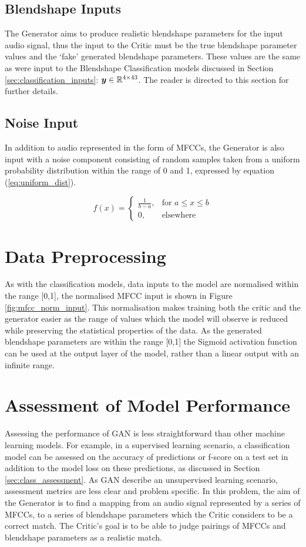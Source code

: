 \subsection{Blendshape Inputs}
The Generator aims to produce realistic blendshape parameters for the input audio signal, thus the input to the Critic must be the true blendshape parameter values and the `fake' generated blendshape parameters.
These values are the same as were input to the Blendshape Classification models discussed in Section \ref{sec:classification_inputs}: ${\boldsymbol{{y}}} \in \mathbb{R}^{4 \times 43}$.
The reader is directed to this section for further details.

\subsection{Noise Input}
In addition to audio represented in the form of MFCCs, the Generator is also input with a noise component consisting of random samples taken from a uniform probability distribution within the range of 0 and 1, expressed by equation (\ref{eq:uniform_dist}).

\begin{equation}\label{eq:uniform_dist}
    f(x)=\begin{cases}
      \frac{1}{b-a}, & \text{for $a \leq x \leq b$}\\
      0, & \text{elsewhere}
    \end{cases}
\end{equation}

\section{Data Preprocessing}
As with the classification models, data inputs to the model are normalised within the range [0,1], the normalised MFCC input is shown in Figure \ref{fig:mfcc_norm_input}.
This normalisation makes training both the critic and the generator easier as the range of values which the model will observe is reduced while preserving the statistical properties of the data.
As the generated blendshape parameters are within the range [0,1] the Sigmoid activation function can be used at the output layer of the model, rather than a linear output with an infinite range.

\section{Assessment of Model Performance}
Assessing the performance of GAN is less straightforward than other machine learning models.
For example, in a supervised learning scenario, a classification model can be assessed on the accuracy of predictions or f-score on a test set in addition to the model loss on these predictions, as discussed in Section \ref{sec:class_assessment}.
As GAN describe an unsupervised learning scenario, assessment metrics are less clear and problem specific.
In this problem, the aim of the Generator is to find a mapping from an audio signal represented by a series of MFCCs, to a series of blendshape parameters which the Critic considers to be a correct match.
The Critic's goal is to be able to judge pairings of MFCCs and blendshape parameters as a realistic match.

